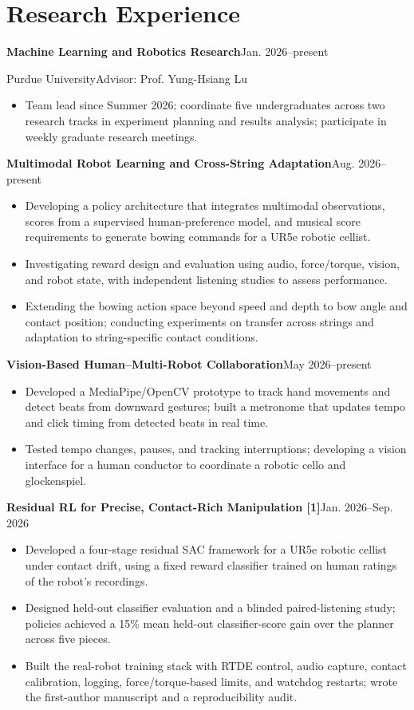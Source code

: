 \documentclass[10pt,letterpaper]{article}
\newcommand{\entry}[2]{\textbf{#1}\hfill #2\par}
\newcommand{\subentry}[2]{\vspace{4pt}\textbf{#1}\hfill #2\par}
\begin{document}
\section{Research Experience}
\entry{Machine Learning and Robotics Research}{Jan. 2026--present}
Purdue University\hfill Advisor: Prof. Yung-Hsiang Lu
\begin{itemize}
\item Team lead since Summer 2026; coordinate five undergraduates across two research tracks in experiment planning and results analysis; participate in weekly graduate research meetings.
\end{itemize}
\subentry{Multimodal Robot Learning and Cross-String Adaptation}{Aug. 2026--present}
\begin{itemize}
\item Developing a policy architecture that integrates multimodal observations, scores from a supervised human-preference model, and musical score requirements to generate bowing commands for a UR5e robotic cellist.
\item Investigating reward design and evaluation using audio, force/torque, vision, and robot state, with independent listening studies to assess performance.
\item Extending the bowing action space beyond speed and depth to bow angle and contact position; conducting experiments on transfer across strings and adaptation to string-specific contact conditions.
\end{itemize}
\subentry{Vision-Based Human--Multi-Robot Collaboration}{May 2026--present}
\begin{itemize}
\item Developed a MediaPipe/OpenCV prototype to track hand movements and detect beats from downward gestures; built a metronome that updates tempo and click timing from detected beats in real time.
\item Tested tempo changes, pauses, and tracking interruptions; developing a vision interface for a human conductor to coordinate a robotic cello and glockenspiel.
\end{itemize}
\subentry{Residual RL for Precise, Contact-Rich Manipulation [1]}{Jan. 2026--Sep. 2026}
\begin{itemize}
\item Developed a four-stage residual SAC framework for a UR5e robotic cellist under contact drift, using a fixed reward classifier trained on human ratings of the robot's recordings.
\item Designed held-out classifier evaluation and a blinded paired-listening study; policies achieved a 15\% mean held-out classifier-score gain over the planner across five pieces.
\item Built the real-robot training stack with RTDE control, audio capture, contact calibration, logging, force/torque-based limits, and watchdog restarts; wrote the first-author manuscript and a reproducibility audit.
\end{itemize}
\end{document}
